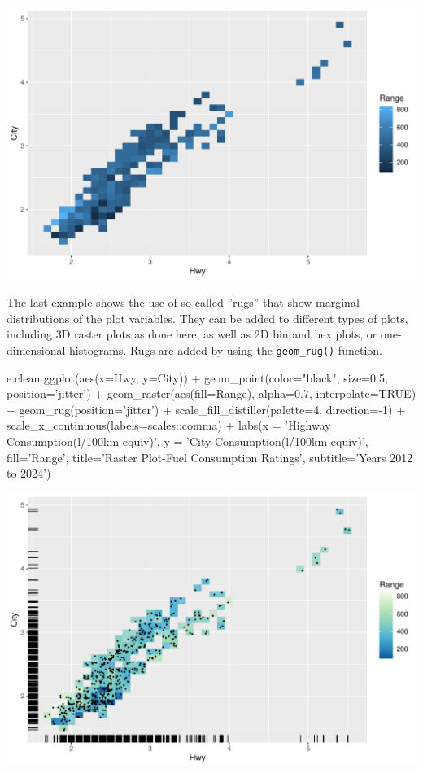 \begin{center}
  \includegraphics[width=.8\textwidth]{fuel.raster.pdf}
\end{center}

The last example shows the use of so-called ''rugs'' that show marginal distributions of the plot variables. They can be added to different types of plots, including 3D raster plots as done here, as well as 2D bin and hex plots, or one-dimensional histograms. Rugs are added by using the \texttt{geom\_rug()} function.

\begin{samepage}
\begin{Rcode}
e.clean %
  ggplot(aes(x=Hwy, y=City)) + 
    geom_point(color="black", size=0.5, 
               position='jitter') +
    geom_raster(aes(fill=Range), alpha=0.7, 
                interpolate=TRUE) + 
    geom_rug(position='jitter') + 
    scale_fill_distiller(palette=4, direction=-1) +
    scale_x_continuous(labels=scales::comma) +
    labs(x = 'Highway Consumption\n(l/100km equiv)', 
         y = 'City Consumption\n(l/100km equiv)', 
         fill='Range', 
         title='Raster Plot-Fuel Consumption Ratings', 
         subtitle='Years 2012 to 2024') 
\end{Rcode}
\end{samepage}

\begin{center}
  \includegraphics[width=.8\textwidth]{fuel.raster.rug.pdf}
\end{center}

